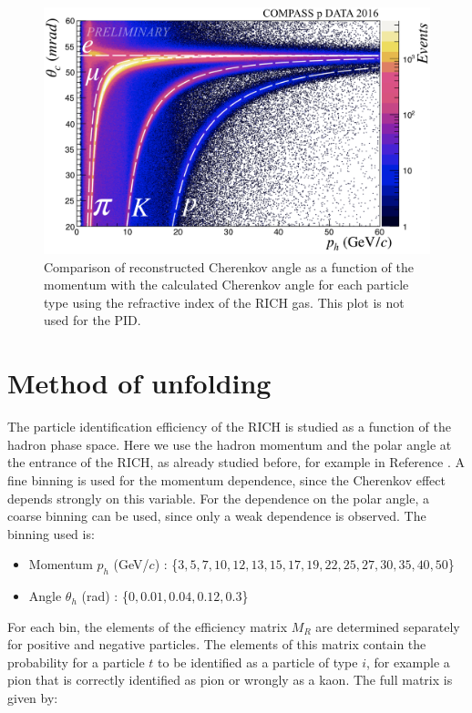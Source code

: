 \begin{figure}[!h]
  \centering
	\includegraphics[scale=0.45]{./gfx/RICHIndices.png}
	\caption{Comparison of reconstructed Cherenkov angle as a function of the momentum with the calculated Cherenkov angle for each particle type using the refractive index of the RICH gas. This plot is not used for the PID.}
	\label{pic:RefIndex}
\end{figure}

\section{Method of unfolding}

The particle identification efficiency of the RICH is studied as a function of the hadron phase space. Here we use the hadron momentum and the polar angle at the entrance of the RICH, as already studied before, for example in Reference \cite{Curiel}. A fine binning is used for the momentum dependence, since the Cherenkov effect depends strongly on this variable. For the dependence on the polar angle, a coarse binning can be used, since only a weak dependence is observed. The binning used is:

\begin{itemize}
  \item Momentum $p_h$ (GeV/$c$) : \{$3,5,7,10,12,13,15,17,19,22,25,27,30,35,40,50$\}
  \item Angle $\theta_h$ (rad) : \{$0,0.01,0.04,0.12,0.3$\}
\end{itemize}

For each bin, the elements of the efficiency matrix $M_R$ are determined separately for positive and negative particles. The elements of this matrix contain the probability for a particle $t$ to be identified as a particle of type $i$, for example a pion that is correctly identified as pion or wrongly as a kaon. The full matrix is given by:

